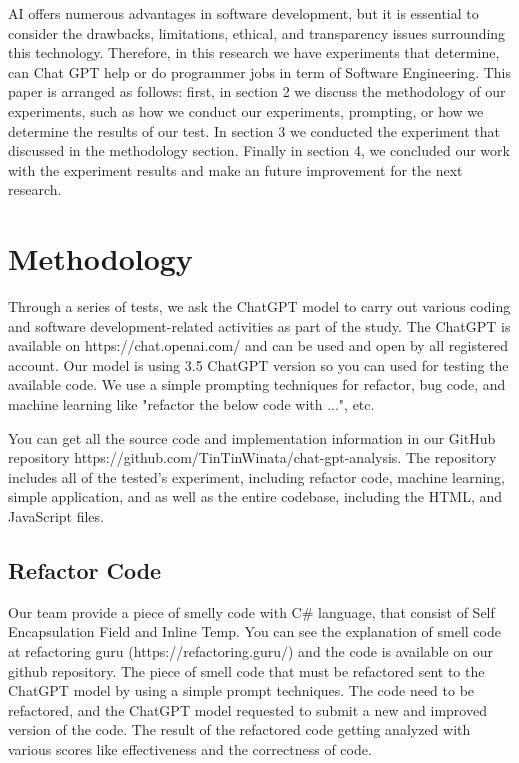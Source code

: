 \documentclass[conference]{IEEEtran}
\begin{document}
AI offers numerous advantages in software development, but it is essential to consider the drawbacks, limitations, ethical, and transparency issues surrounding this technology. Therefore, in this research we have experiments that determine, can Chat GPT help or do programmer jobs in term of Software Engineering. This paper is arranged as follows: first, in section 2 we discuss the methodology of our experiments, such as how we conduct our experiments, prompting, or how we determine the results of our test. In section 3 we conducted the experiment that discussed in the methodology section. Finally in section 4, we  concluded  our  work with the experiment results and make an future improvement for the next research.  

\section{Methodology}
Through a series of tests, we ask the ChatGPT model to carry out various coding and software development-related activities as part of the study. The ChatGPT is available on https://chat.openai.com/ and can be used and open by all registered account. Our model is using 3.5 ChatGPT version so you can used for testing the available code. We use a simple prompting techniques for refactor, bug code, and machine learning like "refactor the below code with ...", etc. 

You can get all the source code and implementation information in our GitHub repository https://github.com/TinTinWinata/chat-gpt-analysis. The repository includes all of the tested's experiment, including refactor code, machine learning, simple application, and as well as the entire codebase, including the HTML, and JavaScript files.



\subsection{Refactor Code}
Our team provide a piece of smelly code with C\# language, that consist of Self Encapsulation Field and Inline Temp. You can see the explanation of smell code at refactoring guru (https://refactoring.guru/) and the code is available on our github repository. The piece of smell code that must be refactored sent to the ChatGPT model by using a simple prompt techniques. The code need to be refactored, and the ChatGPT model requested to submit a new and improved version of the code. The result of the refactored code getting analyzed with various scores like effectiveness and the correctness of code. 
\end{document}
